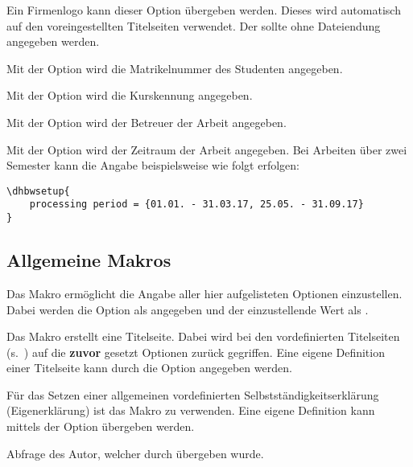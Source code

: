 \documentclass[babel=ngerman,highlight=false]{skdoc}
\begin{document}
            Ein Firmenlogo kann dieser Option übergeben werden. Dieses wird automatisch auf den voreingestellten Titelseiten verwendet. Der  sollte ohne Dateiendung angegeben werden.\medskip
            
            Mit der Option wird die Matrikelnummer des Studenten angegeben.\medskip
            
            Mit der Option wird die Kurskennung angegeben.\medskip
            
            Mit der Option wird der Betreuer der Arbeit angegeben.\medskip
            
            Mit der Option wird der Zeitraum der Arbeit angegeben. Bei Arbeiten über zwei Semester kann die Angabe beispielsweise wie folgt erfolgen:
            \begin{verbatim}
\dhbwsetup{
    processing period = {01.01. - 31.03.17, 25.05. - 31.09.17}
}
            \end{verbatim}
            
        \subsection{Allgemeine Makros}\label{subsec:macro}
            \DescribeMacro{} Das Makro ermöglicht die Angabe aller hier aufgelisteten Optionen einzustellen. Dabei werden die Option als  angegeben und der einzustellende Wert als .
            
            \DescribeMacro\dhbwtitlepage Das Makro erstellt eine Titelseite. Dabei wird bei den vordefinierten Titelseiten (s.~) auf die \textbf{zuvor} gesetzt Optionen zurück gegriffen. Eine eigene Definition einer Titelseite kann durch die Option  angegeben werden.
            
            \DescribeMacro\dhbwdeclaration Für das Setzen einer allgemeinen vordefinierten Selbstständigkeitserklärung (Eigenerklärung) ist das Makro zu verwenden. Eine eigene Definition kann mittels der Option  übergeben werden.
            
            \DescribeMacro\getAuthor Abfrage des Autor, welcher durch  übergeben wurde.
            
\end{document}
